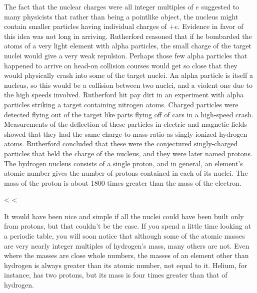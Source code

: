         The fact that the nuclear charges were all integer multiples
        of $e$ suggested to many physicists that rather than being a
        pointlike object, the nucleus might contain smaller
        particles having individual charges of $+e$. Evidence in
        favor of this idea was not long in arriving. Rutherford
        reasoned that if he bombarded the atoms of a very light
        element with alpha particles, the small charge of the target
        nuclei would give a very weak repulsion. Perhaps those few
        alpha particles that happened to arrive on head-on collision
        courses would get so close that they would physically crash
        into some of the target nuclei. An alpha particle is itself
        a nucleus, so this would be a collision between two nuclei,
        and a violent one due to the high speeds involved.
        Rutherford hit pay dirt in an experiment with alpha
        particles striking a target containing nitrogen atoms.
        Charged particles were detected flying out of the target
        like parts flying off of cars in a high-speed crash.
        Measurements of the deflection of these particles in
        electric and magnetic fields showed that they had the same
        charge-to-mass ratio as singly-ionized hydrogen atoms.
        Rutherford concluded that these were the conjectured
        singly-charged particles that held the charge of the
        nucleus, and they were later named protons. The hydrogen
        nucleus consists of a single proton, and in general, an
        element's atomic number gives the number of protons
        contained in each of its nuclei. The mass of the proton is
        about 1800 times greater than the mass of the electron.

    <%
    <%

        It would have been nice and simple if all the nuclei could
        have been built only from protons, but that couldn't be the
        case. If you spend a little time looking at a periodic
        table, you will soon notice that although some of the atomic
        masses are very nearly integer multiples of hydrogen's mass,
        many others are not. Even where the masses are close whole
        numbers, the masses of an element other than hydrogen is
        always greater than its atomic number, not equal to it.
        Helium, for instance, has two protons, but its mass is four
        times greater than that of hydrogen.

